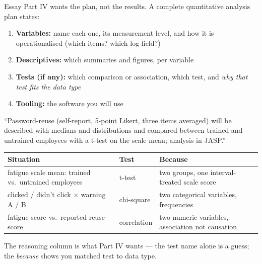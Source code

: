 \documentclass[11pt,a4paper,british,twoside=false,headings=small,chapterprefix=false,numbers=noenddot]{scrbook}
\newenvironment{block}[1]{\begin{tcolorbox}[scriptbox, title={#1}]}{\end{tcolorbox}}
\begin{document}
\begin{center}\small
Essay Part IV wants the plan, not the results. A complete quantitative
  analysis plan states:
  
  \begin{enumerate}\setlength{\itemsep}{0.4em}
    \item \textbf{Variables:} name each one, its measurement level, and how
          it is operationalised (which items? which log field?)
    \item \textbf{Descriptives:} which summaries and figures, per variable
    \item \textbf{Tests (if any):} which comparison or association, which
          test, and \emph{why that test fits the data type}
    \item \textbf{Tooling:} the software you will use
  \end{enumerate}
  
  \begin{block}{Example line}
    ``Password-reuse (self-report, 5-point Likert, three items averaged) will
    be described with medians and distributions and compared between trained
    and untrained employees with a t-test on the scale mean; analysis in
    JASP.''
  \end{block}
\end{center}

\begin{center}\small
\footnotesize
  \renewcommand{\arraystretch}{1.35}
  \begin{tabular}{@{}p{6.6cm}p{2.4cm}p{3.8cm}@{}}
    \toprule
    \textbf{Situation} & \textbf{Test} & \textbf{Because}\\
    \midrule
    fatigue scale mean: trained vs.\ untrained employees & t-test & two groups, one interval-treated scale score\\
    clicked / didn't click $\times$ warning A / B & chi-square & two categorical variables, frequencies\\
    fatigue score vs.\ reported reuse score & correlation & two numeric variables, association not causation\\
    \bottomrule
  \end{tabular}
  

  The reasoning column is what Part IV wants --- the test name alone is a
  guess; the \emph{because} shows you matched test to data type.
\end{center}
\end{document}
